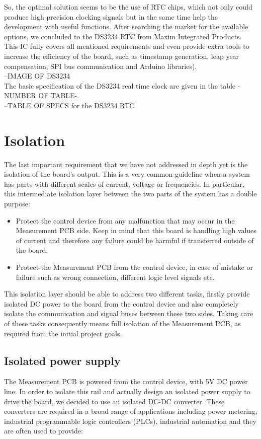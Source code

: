 So, the optimal solution seems to be the use of RTC chips, which not only could produce high precision clocking signals but in the same time help the development with useful functions. After searching the market for the available options, we concluded to the DS3234 RTC from Maxim Integrated Products. This IC fully covers all mentioned requirements and even provide extra tools to increase the efficiency of the board, such as timestamp generation, leap year compensation, SPI bus communication and Arduino libraries).\\

--IMAGE OF DS3234\\

The basic specification of the DS3234 real time clock are given in the table -NUMBER OF TABLE-.\\

--TABLE OF SPECS for the DS3234 RTC\\

\section{Isolation}
The last important requirement that we have not addressed in depth yet is the isolation of the board's output. This is a very common guideline when a system has parts with different scales of current, voltage or frequencies. In particular, this intermediate isolation layer between the two parts of the system has a double purpose:

\begin{itemize}
    \item Protect the control device from any malfunction that may occur in the Measurement PCB side. Keep in mind that this board is handling high values of current and therefore any failure could be harmful if transferred outside of the board.
    \item Protect the Measurement PCB from the control device, in case of mistake or failure such as wrong connection, different logic level signals etc.
\end{itemize}

This isolation layer should be able to address two different tasks, firstly provide isolated DC power to the board from the control device and also completely isolate the communication and signal buses between these two sides. Taking care of these tasks consequently means full isolation of the Measurement PCB, as required from the initial project goals.

\subsection{Isolated power supply}
The Measurement PCB is powered from the control device, with 5V DC power line. In order to isolate this rail and actually design an isolated power supply to drive the board, we decided to use an isolated DC-DC converter. These converters are required in a broad range of applications including power metering, industrial programmable logic controllers (PLCs), industrial automation and they are often used to provide:

